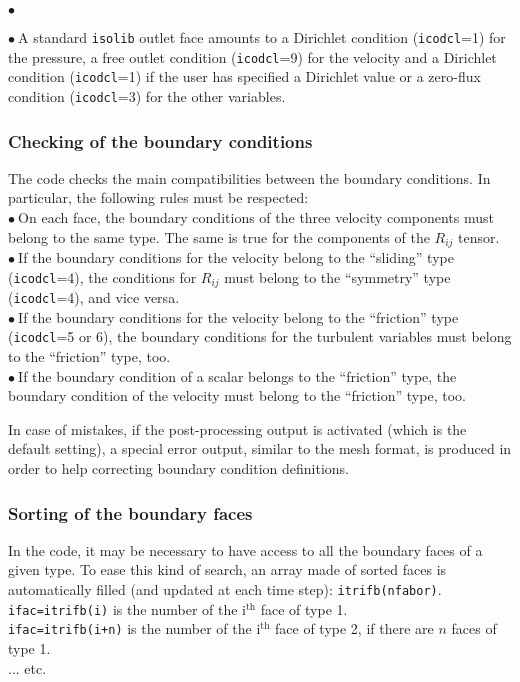 {{{\begin{list}{$\bullet$}{}
\end{list}

$\bullet\ $A standard \texttt{isolib} outlet face amounts to a Dirichlet
condition (\texttt{icodcl}=1) for the pressure, a free outlet condition
(\texttt{icodcl}=9) for the velocity and a Dirichlet condition
(\texttt{icodcl}=1) if the user has specified a Dirichlet value or a zero-flux
condition (\texttt{icodcl}=3) for the other variables.\\

\subsubsection{Checking of the boundary conditions}

The code checks the main compatibilities between the boundary
conditions. In particular, the following rules must be respected: \\
$\bullet\ $On each face, the boundary conditions of the three velocity components must belong to the same type. The same is true for the components of the $R_{ij}$ tensor.\\
$\bullet\ $If the boundary conditions for the velocity belong to the
``sliding'' type (\texttt{icodcl}=4), the conditions for $R_{ij}$ must belong to
the ``symmetry'' type (\texttt{icodcl}=4), and vice versa.\\
$\bullet\ $If the boundary conditions for the velocity belong to the
``friction'' type (\texttt{icodcl}=5 or 6), the boundary conditions for the turbulent variables
must belong to the ``friction'' type, too.\\
$\bullet\ $If the boundary condition of a scalar belongs to the
``friction'' type, the boundary condition of the velocity must belong to
the ``friction'' type, too.

In case of mistakes, if the post-processing output is activated (which is the default setting),
a special error output, similar to the mesh format, is produced in order to help
correcting boundary condition definitions.

\subsubsection{Sorting of the boundary faces}

In the code, it may be necessary to have access to all the boundary
faces of a given type. To ease this kind of search, an array made of
sorted faces is automatically filled (and updated at each time step):
\texttt{itrifb(nfabor)}.\\
\texttt{ifac=itrifb(i)} is the number of the i$^{\text{th}}$  face of type
1.\\
\texttt{ifac=itrifb(i+n)} is the number of the i$^{\text{th}}$ face of type
2, if there are $n$ faces of type 1.\\
... etc.

}}}
